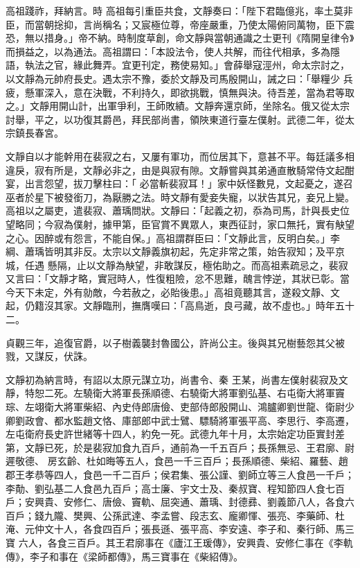 \begin{pinyinscope}
 高祖踐祚，拜納言。時
 高祖每引重臣共食，文靜奏曰：「陛下君臨億兆，率土莫非臣，而當朝捴抑，言尚稱名；又宸極位尊，帝座嚴重，乃使太陽俯同萬物，臣下震恐，無以措身。」帝不納。時制度草創，命文靜與當朝通識之士更刊《隋開皇律令》而損益之，以為通法。高祖謂曰：「本設法令，使人共解，而往代相承，多為隱語，執法之官，緣此舞弄。宜更刊定，務使易知。」會薛舉寇涇州，命太宗討之，以文靜為元帥府長史。遇太宗不豫，委於文靜及司馬殷開山，誡之曰：「舉糧少
 兵疲，懸軍深入，意在決戰，不利持久，即欲挑戰，慎無與決。待吾差，當為君等取之。」文靜用開山計，出軍爭利，王師敗績。文靜奔還京師，坐除名。俄又從太宗討舉，平之，以功復其爵邑，拜民部尚書，領陜東道行臺左僕射。武德二年，從太宗鎮長春宮。



 文靜自以才能幹用在裴寂之右，又屢有軍功，而位居其下，意甚不平。每廷議多相違戾，寂有所是，文靜必非之，由是與寂有隙。文靜嘗與其弟通直散騎常侍文起酣宴，出言怨望，拔刀擊柱曰：「
 必當斬裴寂耳！」家中妖怪數見，文起憂之，遂召巫者於星下被發銜刀，為厭勝之法。時文靜有愛妾失寵，以狀告其兄，妾兄上變。高祖以之屬吏，遣裴寂、蕭瑀問狀。文靜曰：「起義之初，忝為司馬，計與長史位望略同；今寂為僕射，據甲第，臣官賞不異眾人，東西征討，家口無托，實有觖望之心。因醉或有怨言，不能自保。」高祖謂群臣曰：「文靜此言，反明白矣。」李綱、蕭瑀皆明其非反。太宗以文靜義旗初起，先定非常之策，始告寂知；及平京城，任遇
 懸隔，止以文靜為觖望，非敢謀反，極佑助之。而高祖素疏忌之，裴寂又言曰：「文靜才略，實冠時人，性復粗險，忿不思難，醜言悖逆，其狀已彰。當今天下未定，外有勍敵，今若赦之，必貽後患。」高祖竟聽其言，遂殺文靜、文起，仍籍沒其家。文靜臨刑，撫膺嘆曰：「高鳥逝，良弓藏，故不虛也。」時年五十二。



 貞觀三年，追復官爵，以子樹義襲封魯國公，許尚公主。後與其兄樹藝怨其父被戮，又謀反，伏誅。



 文靜初為納言時，有詔以太原元謀立功，尚書令、秦
 王某，尚書左僕射裴寂及文靜，特恕二死。左驍衛大將軍長孫順德、右驍衛大將軍劉弘基、右屯衛大將軍竇琮、左翊衛大將軍柴紹、內史侍郎唐儉、吏部侍郎殷開山、鴻臚卿劉世龍、衛尉少卿劉政會、都水監趙文恪、庫部郎中武士鷿、驃騎將軍張平高、李思行、李高遷，左屯衛府長史許世緒等十四人，約免一死。武德九年十月，太宗始定功臣實封差第，文靜已死，於是裴寂加食九百戶，通前為一千五百戶；長孫無忌、王君廓、尉遲敬德、
 房玄齡、杜如晦等五人，食邑一千三百戶；長孫順德、柴紹、羅藝、趙郡王孝恭等四人，食邑一千二百戶；侯君集、張公謹、劉師立等三人食邑一千戶；李勣、劉弘基二人食邑九百戶；高士廉、宇文士及、秦叔寶、程知節四人食七百戶；安興貴、安修仁、唐儉、竇軌、屈突通、蕭瑀、封德彞、劉義節八人，各食六百戶；錢九隴、樊興、公孫武達、李孟嘗、段志玄、龐卿惲、張亮、李藥師、杜淹、元仲文十人，各食四百戶；張長遜、張平高、李安遠、李子和、秦行師、馬三寶
 六人，各食三百戶。其王君廓事在《廬江王瑗傳》，安興貴、安修仁事在《李軌傳》，李子和事在《梁師都傳》，馬三寶事在《柴紹傳》。




\end{pinyinscope}
